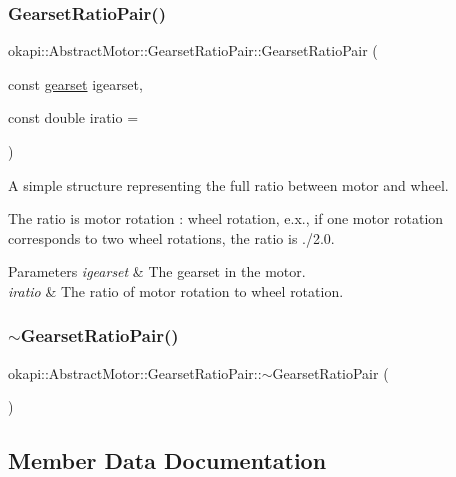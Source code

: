 \subsubsection{\texorpdfstring{GearsetRatioPair()}{GearsetRatioPair()}}
{\footnotesize\ttfamily okapi\+::\+Abstract\+Motor\+::\+Gearset\+Ratio\+Pair\+::\+Gearset\+Ratio\+Pair (\begin{DoxyParamCaption}\item[{const \mbox{\hyperlink{classokapi_1_1AbstractMotor_a88aaa6ea2fa10f5520a537bbf26774d5}{gearset}}}]{igearset,  }\item[{const double}]{iratio = {} }\end{DoxyParamCaption})\hspace{0.3cm}{\ttfamily [inline]}}

A simple structure representing the full ratio between motor and wheel.

The ratio is {\ttfamily motor rotation \+: wheel rotation}, e.\+x., if one motor rotation corresponds to two wheel rotations, the ratio is {./2.0}.


\begin{DoxyParams}{Parameters}
{\em igearset} & The gearset in the motor. \\
\hline
{\em iratio} & The ratio of motor rotation to wheel rotation. \\
\hline
\end{DoxyParams}
\mbox{\label{structokapi_1_1AbstractMotor_1_1GearsetRatioPair_a78b0163286cab14b29c8545aaf8ccd9d}} 
\subsubsection{\texorpdfstring{$\sim$GearsetRatioPair()}{~GearsetRatioPair()}}
{\footnotesize\ttfamily okapi\+::\+Abstract\+Motor\+::\+Gearset\+Ratio\+Pair\+::$\sim$\+Gearset\+Ratio\+Pair (\begin{DoxyParamCaption}{ }\end{DoxyParamCaption})\hspace{0.3cm}{\ttfamily [default]}}



\subsection{Member Data Documentation}
\mbox{\label{structokapi_1_1AbstractMotor_1_1GearsetRatioPair_aa98dba092145fa1f0f2669d754e2e37d}} 
